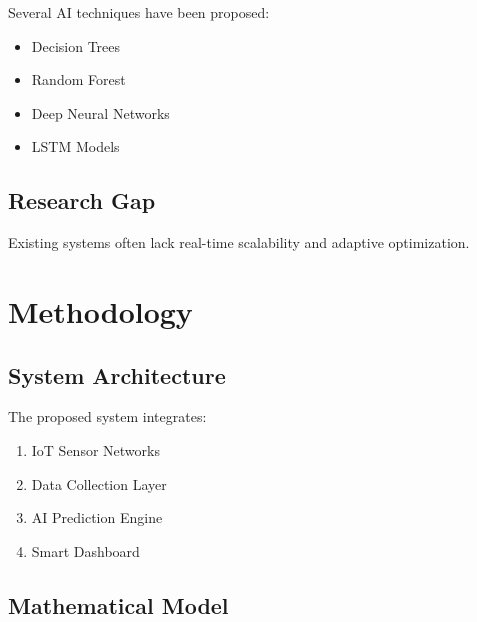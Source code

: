\documentclass[12pt,a4paper]{report}
\begin{document}
	Several AI techniques have been proposed:
	
	\begin{itemize}
		
		\item Decision Trees
		
		\item Random Forest
		
		\item Deep Neural Networks
		
		\item LSTM Models
		
	\end{itemize}
	
	\section{Research Gap}
	
	Existing systems often lack real-time scalability and adaptive optimization.
	
	
	\chapter{Methodology}
	
	\section{System Architecture}
	
	The proposed system integrates:
	
	\begin{enumerate}
		
		\item IoT Sensor Networks
		
		\item Data Collection Layer
		
		\item AI Prediction Engine
		
		\item Smart Dashboard
		
	\end{enumerate}
	
	\section{Mathematical Model}
	
\end{document}
